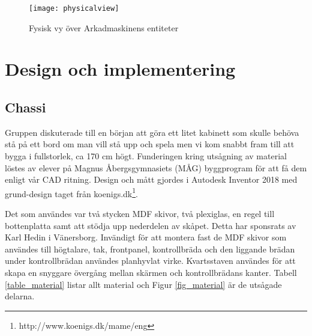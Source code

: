 \documentclass[12pt,fleqn,openany]{book} %
\begin{document}
\begin{figure}[!h]
\centering\texttt{[image: physicalview]}
\caption{Fysisk vy över Arkadmaskinens entiteter}
\label{fig_physview}
\end{figure}


\chapter{Design och implementering}
\section{Chassi}
Gruppen diskuterade till en början att göra ett litet kabinett som skulle behöva stå på ett bord om man vill stå upp och
spela men vi kom snabbt fram till att bygga i fullstorlek, ca 170 cm högt. Funderingen kring utsågning av material löstes av elever
på Magnus Åbergsgymnasiets (MÅG) byggprogram för att få dem enligt vår CAD ritning. Design och mått gjordes i Autodesk Inventor 
2018 med grund-design taget från koenigs.dk\footnote{http://www.koenigs.dk/mame/eng}.

Det som användes var två stycken MDF skivor, två plexiglas, en regel till bottenplatta samt att stödja upp nederdelen av skåpet. 
Detta har sponsrats av Karl Hedin i Vänersborg. Invändigt för att montera fast de MDF skivor som användes till högtalare, tak, 
frontpanel, kontrollbräda och den liggande brädan under kontrollbrädan användes planhyvlat virke. Kvartsstaven användes för att 
skapa en snyggare övergång mellan skärmen och kontrollbrädans kanter. Tabell \ref{table_material} listar allt material och Figur \ref{fig_material} är de utsågade delarna.

\begin{table}[h]
\centering
\caption{Material som användes}
\label{table_material}
\end{table}
\end{document}
